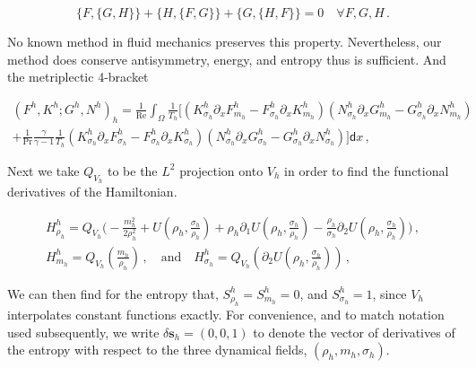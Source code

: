 \begin{equation}
    \{ F, \{G, H\}\}
    +
    \{ H, \{F, G\}\}
    +
    \{ G, \{H, F\}\}
    = 0 \quad \forall F, G, H \,.
\end{equation}

No known method in fluid mechanics preserves this property. Nevertheless, our method does conserve antisymmetry, energy, and entropy thus is sufficient.
And the metriplectic 4-bracket

\begin{multline}
    (F^h, K^h; G^h, N^h)_h
    =
    \frac{1}{\text{Re}}
    \int_\Omega
    \frac{1}{T_h}
    \bigg[
    \left(
    K^h_{\sigma_h} \partial_x F^h_{m_h}
    -
    F^h_{\sigma_h} \partial_x K^h_{m_h}
    \right)
    \left(
    N^h_{\sigma_h} \partial_x G^h_{m_h}
    -
    G^h_{\sigma_h} \partial_x N^h_{m_h}
    \right) \\
    +
    \frac{1}{\text{Pr}} \frac{\gamma}{\gamma - 1}
    \frac{1}{T_h}
    \left(
    K^h_{\sigma_h} \partial_x F^h_{\sigma_h}
    -
    F^h_{\sigma_h} \partial_x K^h_{\sigma_h}
    \right)
    \left(
    N^h_{\sigma_h} \partial_x G^h_{\sigma_h}
    -
    G^h_{\sigma_h} \partial_x N^h_{\sigma_h}
    \right)
    \bigg]
    \mathsf{d} x \,,
\end{multline}

Next we take $Q_{V_h}$ to be the $L^2$ projection onto $V_h$ in order to find the functional derivatives of the Hamiltonian.

\begin{multline}
    H_{\rho_h}^h
    =
    Q_{V_h} \bigg(
    - \frac{m_h^2}{2 \rho_h^2}
    + U \left(\rho_h, \frac{\sigma_h}{\rho_h} \right)
    + \rho_h \partial_1 U \left(\rho_h, \frac{\sigma_h}{\rho_h} \right)
    - \frac{\rho_h}{\sigma_h} \partial_2 U  \left(\rho_h, \frac{\sigma_h}{\rho_h} \right)
    \bigg) \,, \\
    H_{m_h}^h
    =
    Q_{V_h} \left( \frac{m_h}{\rho_h} \right) \,,
    \quad \text{and} \quad
    H_{\sigma_h}^h
    =
    Q_{V_h} \left( \partial_2 U  \left(\rho_h, \frac{\sigma_h}{\rho_h} \right) \right) \,,
    \quad
\end{multline}

We can then find for the entropy that, $S_{\rho_h}^h = S_{m_h}^h = 0$, and $S_{\sigma_h}^h = 1$, since $V_h$ interpolates constant functions exactly. For convenience, and to match notation used subsequently, we write $\delta \bm{s}_h = (0, 0, 1)$ to denote the vector of derivatives of the entropy with respect to the three dynamical fields, $(\rho_h, m_h, \sigma_h)$.

